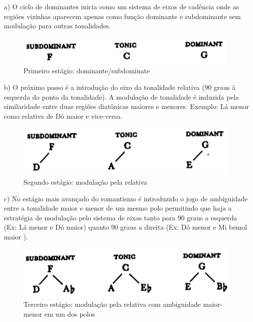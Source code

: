 \documentclass[
	12pt,				%
	openright,			%
	twoside,			%
	a4paper,			%
	english,			%
	french,				%
	spanish,			%
	brazil				%
	]{abntex2}
\begin{document}
a) O ciclo de dominantes inicia como um sistema de eixos de cadência onde as regiões vizinhas aparecem apenas como função dominante e subdominante sem modulação para outras tonalidades. 

\begin{figure}[!h]
	\caption{\label{fig_grafico}Primeiro estágio: dominante/subdominate}
	\begin{center}
	    \includegraphics[scale=0.5]{axis/estagio01.png}
	\end{center}
\end{figure}


b) O próximo passo é a introdução do eixo da tonalidade relativa (90 graus à esquerda do ponto da tonalidade). A modulação de tonalidade é induzida pela similaridade entre duas regiões diatônicas maiores e menores. Exemplo: Lá menor como relativa de Dó maior e vice-versa.

\begin{figure}[!h]
	\caption{\label{fig_grafico}Segundo estágio: modulação pela relativa}
	\begin{center}
	    \includegraphics[scale=0.5]{axis/estagio02.png}
	\end{center}
\end{figure}


c) No estágio mais avançado do romantismo é introduzido o jogo de ambiguidade entre a tonalidade maior e menor de um mesmo polo permitindo que haja a estratégia de modulação pelo sistema de eixos tanto para 90 graus a esquerda (Ex: Lá menor e Dó maior) quanto 90 graus a direita (Ex: Dó menor e Mi bemol maior ).

\begin{figure}[!h]
	\caption{\label{fig_grafico}Terceiro estágio: modulação pela relativa com ambiguidade maior-menor em um dos polos }
	\begin{center}
	    \includegraphics[scale=0.5]{axis/estagio03.png}
	\end{center}
\end{figure}
\end{document}
